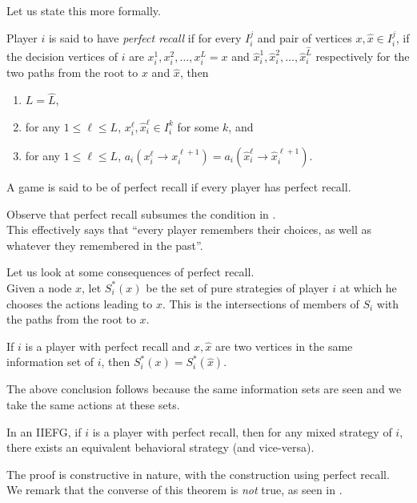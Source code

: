 		Let us state this more formally.

		\begin{fdef}
			Player $i$ is said to have \emph{perfect recall} if for every $I_i^j$ and pair of vertices $x,\hat{x} \in I_i^j$, if the decision vertices of $i$ are $x_i^1,x_i^2,\ldots,x_i^L = x$ and $\hat{x}_i^1,\hat{x}_i^2,\ldots,\hat{x}_i^{\hat{L}}$ respectively for the two paths from the root to $x$ and $\hat{x}$, then
			\begin{enumerate}
				\item $L = \hat{L}$,
				\item for any $1 \le \ell \le L$, $x_i^\ell,\hat{x}_i^\ell \in I_i^k$ for some $k$, and
				\item for any $1 \le \ell \le L$, $a_i(x_i^\ell \to x_i^{\ell+1}) = a_i(\hat{x}_i^\ell \to \hat{x}_i^{\ell+1})$.
			\end{enumerate}
			A game is said to be of perfect recall if every player has perfect recall.
		\end{fdef}

		Observe that perfect recall subsumes the condition in .\\
		This effectively says that ``every player remembers their choices, as well as whatever they remembered in the past''.

		Let us look at some consequences of perfect recall.\\
		Given a node $x$, let $S_i^*(x)$ be the set of pure strategies of player $i$ at which he chooses the actions leading to $x$. This is the intersections of members of $S_i$ with the paths from the root to $x$.
		\begin{ftheo}
			If $i$ is a player with perfect recall and $x,\hat{x}$ are two vertices in the same information set of $i$, then $S_i^*(x) = S_i^*(\hat{x})$.
		\end{ftheo}

		The above conclusion follows because the same information sets are seen and we take the same actions at these sets.

		\begin{ftheo}[Kuhn]
			In an IIEFG, if $i$ is a player with perfect recall, then for any mixed strategy of $i$, there exists an equivalent behavioral strategy (and vice-versa).
		\end{ftheo}
		The proof is constructive in nature, with the construction using perfect recall.\\
		We remark that the converse of this theorem is \emph{not} true, as seen in .

